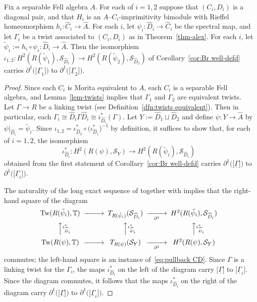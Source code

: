 \documentclass[12pt,a4paper]{amsart}
\newcommand{\field}[1]{\mathbb{#1}}
\newcommand{\TT}{\field{T}}
\newcommand{\Tgerms}{\mathcal{S}}
\begin{document}
\begin{thm}\label{thm:DD class well-defd}
Fix a separable Fell algebra $A$. For each of $i = 1,2$ suppose
that $(C_i, D_i)$ is a diagonal pair, and that $H_i$ is an
$A$--$C_i$-imprimitivity bimodule with Rieffel homeomorphism
$h_i : \widehat{C}_i \to \widehat{A}$. For each $i$, let
$\psi_i : \widehat{D}_i \to \widehat{C}_i$ be the spectral map,
and let $\Gamma_i$ be a twist associated to $(C_i, D_i)$ as in
Theorem~\ref{thm-alex}. For each $i$, let $\tilde\psi_i := h_i
\circ \psi_i : \widehat{D}_i \to \widehat{A}$. Then the
isomorphism $\iota_{1,2} : H^2(R(\tilde{\psi}_1),
\Tgerms_{\widehat{D}_1}) \to H^2(R(\tilde{\psi}_2),
\Tgerms_{\widehat{D}_2})$ of Corollary~\ref{cor:Br well-defd}
carries
$\partial^1\big(\!\big[\underline{\Gamma}_1\big]\!\big)$ to
$\partial^1\big(\!\big[\underline{\Gamma}_2\big]\!\big)$.
\end{thm}
\begin{proof}
Since each $C_i$ is Morita equivalent to $A$, each $C_i$ is a
separable Fell algebra, and Lemma~\ref{lem-twists} implies that
$\Gamma_1$ and $\Gamma_2$ are equivalent twists. Let $\Gamma \to
R$ be a linking twist (see Definition~\ref{dfn:twists
equivalent}). Then in particular, each $\Gamma_i \cong
\widehat{D}_i \Gamma \widehat{D}_i \cong
i^*_{\widehat{D_i}}(\Gamma)$. Let
$Y:=\widehat{D}_1\sqcup\widehat{D}_2$ and define $\psi : Y \to
\widehat{A}$ by $\psi|_{\widehat{D}_i} = \tilde{\psi}_i$. Since
$\iota_{1,2} = \iota^*_{\widehat{D}_2} \circ
\big(\iota^*_{\widehat{D}_1}\big)^{-1}$ by definition, it
suffices to show that, for each of $i = 1,2$, the isomorphism
\[
\iota^*_{\widehat{D}_i} : H^2(R(\psi), \Tgerms_Y) \to
H^2(R(\tilde\psi_i), \Tgerms_{\widehat{D}_i})
\]
obtained from the first statement of Corollary~\ref{cor:Br well-defd} carries
$\partial^1\big(\!\big[\underline{\Gamma}\big]\!\big)$ to
$\partial^1\big(\!\big[\underline{\Gamma}_i\big]\!\big)$.

The naturality of the long exact sequence of
\cite[Theorem~3.7]{Kumjian1988} together with
\cite[Corollary~3.4]{Kumjian1988} implies that the right-hand
square of the diagram
\[\begin{CD}
\mathrm{Tw}(R(\tilde{\psi}_i), \TT) @>>> T_{R(\tilde{\psi}_i)}(\Tgerms_{\widehat{D}_i}) @>>{\partial^1}> H^2(R(\tilde{\psi}_i), \Tgerms_{\widehat{D}_i}) \\
@AA{\iota^*_{\widehat{D}_i}}A         @AA{\iota^*_{\widehat{D}_i}}A                         @AA{\iota^*_{\widehat{D}_i}}A \\
\mathrm{Tw}(R(\psi), \TT) @>>> T_{R(\psi)}(\Tgerms_Y) @>>{\partial^1}> H^2(R(\psi), \Tgerms_Y) \\
\end{CD}\]
commutes; the left-hand square is an instance
of~\eqref{eq:pullback CD}. Since $\Gamma$ is a linking twist
for the $\Gamma_i$, the maps $\iota^*_{\widehat{D}_i}$ on the
left of the diagram carry $\big[\underline{\Gamma}\big]$ to
$\big[\underline{\Gamma}_i\big]$. Since the diagram commutes,
it follows that the maps $\iota^*_{\widehat{D}_i}$ on the right
of the diagram carry
$\partial^1\big(\!\big[\underline{\Gamma}\big]\!\big)$ to
$\partial^1\big(\!\big[\underline{\Gamma}_i\big]\!\big)$.
\end{proof}
\end{document}
